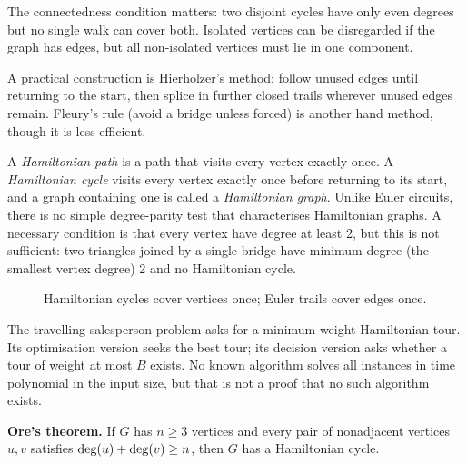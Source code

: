The connectedness condition matters: two disjoint cycles have only even degrees but no single walk can cover both. Isolated vertices can be disregarded if the graph has edges, but all non-isolated vertices must lie in one component.

A practical construction is Hierholzer's method: follow unused edges until returning to the start, then splice in further closed trails wherever unused edges remain. Fleury's rule (avoid a bridge unless forced) is another hand method, though it is less efficient.

A \emph{Hamiltonian path} is a path that visits every vertex exactly once. A \emph{Hamiltonian cycle} visits every vertex exactly once before returning to its start, and a graph containing one is called a \emph{Hamiltonian graph}. Unlike Euler circuits, there is no simple degree-parity test that characterises Hamiltonian graphs. A necessary condition is that every vertex have degree at least 2, but this is not sufficient: two triangles joined by a single bridge have minimum degree (the smallest vertex degree) 2 and no Hamiltonian cycle.

\begin{figure}[htbp]
\centering
{}
\caption{Hamiltonian cycles cover vertices once; Euler trails cover edges once.}
\end{figure}

\Challenge{} The travelling salesperson problem asks for a minimum-weight Hamiltonian tour. Its optimisation version seeks the best tour; its decision version asks whether a tour of weight at most $B$ exists. No known algorithm solves all instances in time polynomial in the input size, but that is not a proof that no such algorithm exists.

\Challenge{} \textbf{Ore's theorem.} If $G$ has $n\geq 3$ vertices and every pair of nonadjacent vertices $u,v$ satisfies $\operatorname{deg}(u)+\operatorname{deg}(v)\geq n$, then $G$ has a Hamiltonian cycle.

